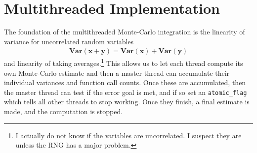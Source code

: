 \documentclass[landscape]{article}
\numberwithin{equation}{section}
\begin{document}
\section{Multithreaded Implementation}

The foundation of the multithreaded Monte-Carlo integration is the linearity of variance for uncorrelated random variables
\begin{align*}
\mathbf{Var}(\mathbf{x} + \mathbf{y}) = \mathbf{Var}(\mathbf{x}) + \mathbf{Var}(\mathbf{y})
\end{align*}
and linearity of taking averages.\footnote{I actually do not know if the variables are uncorrelated. I suspect they are unless the RNG has a major problem.}
This allows us to let each thread compute its own Monte-Carlo estimate and then a master thread can accumulate their individual variances and function call counts.
Once these are accumulated, then the master thread can test if the error goal is met, and if so set an \texttt{atomic\_flag} which tells all other threads to stop working.
Once they finish, a final estimate is made, and the computation is stopped.
\end{document}
